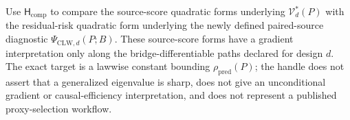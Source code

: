 Use \(\mathsf H_{\mathrm{comp}}\) to compare the source-score quadratic forms underlying \(\mathcal V_d^*(P)\) with the residual-risk quadratic form underlying the newly defined paired-source diagnostic \(\Psi_{\mathrm{CLW},d}(P;B)\).  These source-score forms have a gradient interpretation only along the bridge-differentiable paths declared for design \(d\).  The exact target is a lawwise constant bounding \(\rho_{\mathrm{pred}}(P)\); the handle does not assert that a generalized eigenvalue is sharp, does not give an unconditional gradient or causal-efficiency interpretation, and does not represent a published proxy-selection workflow.